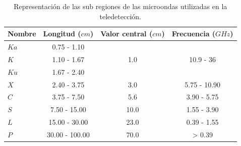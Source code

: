 \begin{table}[H]
    \caption{Representación de las sub regiones de las microondas utilizadas en la teledetección.}
    \small
    \begin{tabularx}{1\textwidth}{Xccc}
        \hline
        \textbf{Nombre \hspace{1cm}} & \textbf{\hspace{0.5cm}Longitud ($cm$)\hspace{0.5cm}} & \textbf{\hspace{0.5cm}Valor central ($cm$)\hspace{0.5cm}} & \textbf{Frecuencia ($GHz$)} \\ \hline
        $Ka$                         & 0.75 - 1.10                                          &                                                           &                             \\
        $K$                          & 1.10 - 1.67                                          & 1.0                                                       & 10.9 - 36                   \\
        $Ku$                         & 1.67 - 2.40                                          &                                                           &                             \\ \hline
        $X$                          & 2.40 - 3.75                                          & 3.0                                                       & 5.75 - 10.90                \\ \hline
        $C$                          & 3.75 - 7.50                                          & 5.6                                                       & 3.90 - 5.75                 \\ \hline
        $S$                          & 7.50 - 15.00                                         & 10.0                                                      & 1.55 - 3.90                 \\ \hline
        $L$                          & 15.00 - 30.00                                        & 23.0                                                      & 0.39 - 1.55                 \\ \hline
        $P$                          & 30.00 - 100.00                                       & 70.0                                                      & > 0.39                      \\ \hline
    \end{tabularx}
    \begin{minipage}{\textwidth}
        \vspace{10pt}
        \label{tab:BandasMW}
    \end{minipage}
\end{table}

